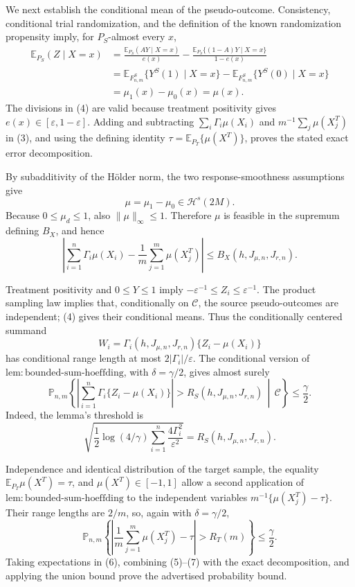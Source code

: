 We next establish the conditional mean of the pseudo-outcome.  Consistency, conditional trial randomization, and the definition of the known randomization propensity imply, for \(P_S\)-almost every \(x\),
\[
\begin{aligned}
\mathbb E_{P_S}(Z\mid X=x)
&=\frac{\mathbb E_{P_S}(AY\mid X=x)}{e(x)}
-\frac{\mathbb E_{P_S}\{(1-A)Y\mid X=x\}}{1-e(x)}\\
&=\mathbb E_{F^S_{n,m}}\{Y^S(1)\mid X=x\}
-\mathbb E_{F^S_{n,m}}\{Y^S(0)\mid X=x\}\\
&=\mu_1(x)-\mu_0(x)=\mu(x).
\end{aligned}
\tag{4}
\]
The divisions in (4) are valid because treatment positivity gives \(e(x)\in[\varepsilon,1-\varepsilon]\).  Adding and subtracting \(\sum_i\Gamma_i\mu(X_i)\) and \(m^{-1}\sum_j\mu(X_j^T)\) in (3), and using the defining identity \(\tau=\mathbb E_{P_T}\{\mu(X^T)\}\), proves the stated exact error decomposition.

By subadditivity of the H\"older norm, the two response-smoothness assumptions give
\[
\mu=\mu_1-\mu_0\in\mathcal H^s(2M).
\]
Because \(0\le\mu_d\le1\), also \(\|\mu\|_\infty\le1\).  Therefore \(\mu\) is feasible in the supremum defining \(B_X\), and hence
\[
\left|\sum_{i=1}^n\Gamma_i\mu(X_i)
-\frac1m\sum_{j=1}^m\mu(X_j^T)\right|
\le B_X(h,J_{\mu,n},J_{r,n}).
\tag{5}
\]

Treatment positivity and \(0\le Y\le1\) imply \(-\varepsilon^{-1}\le Z_i\le\varepsilon^{-1}\).  The product sampling law implies that, conditionally on \(\mathcal C\), the source pseudo-outcomes are independent; (4) gives their conditional means.  Thus the conditionally centered summand
\[
W_i=\Gamma_i(h,J_{\mu,n},J_{r,n})\{Z_i-\mu(X_i)\}
\]
has conditional range length at most \(2|\Gamma_i|/\varepsilon\).  The conditional version of \(\mathrm{lem:bounded\text{-}sum\text{-}hoeffding}\), with \(\delta=\gamma/2\), gives almost surely
\[
\mathbb P_{n,m}\!\left\{
\left|\sum_{i=1}^n\Gamma_i\{Z_i-\mu(X_i)\}\right|>R_S(h,J_{\mu,n},J_{r,n})
\,\middle|\,\mathcal C\right\}
\le\frac\gamma2.
\tag{6}
\]
Indeed, the lemma's threshold is
\[
\sqrt{\frac12\log(4/\gamma)\sum_{i=1}^n\frac{4\Gamma_i^2}{\varepsilon^2}}
=R_S(h,J_{\mu,n},J_{r,n}).
\]

Independence and identical distribution of the target sample, the equality \(\mathbb E_{P_T}\mu(X^T)=\tau\), and \(\mu(X^T)\in[-1,1]\) allow a second application of \(\mathrm{lem:bounded\text{-}sum\text{-}hoeffding}\) to the independent variables \(m^{-1}\{\mu(X_j^T)-\tau\}\).  Their range lengths are \(2/m\), so, again with \(\delta=\gamma/2\),
\[
\mathbb P_{n,m}\!\left\{
\left|\frac1m\sum_{j=1}^m\mu(X_j^T)-\tau\right|>R_T(m)
\right\}
\le\frac\gamma2.
\tag{7}
\]
Taking expectations in (6), combining (5)--(7) with the exact decomposition, and applying the union bound prove the advertised probability bound.

